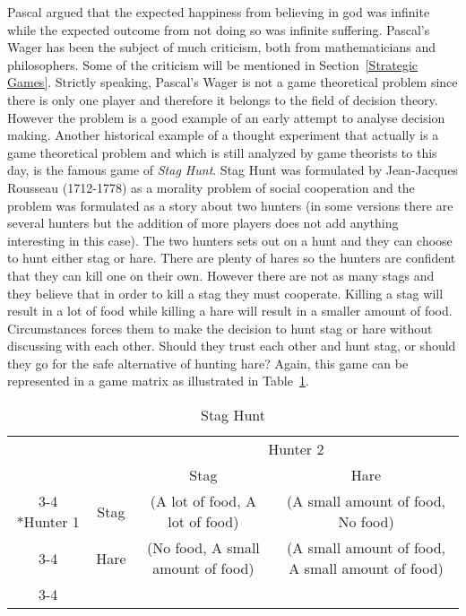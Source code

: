 \documentclass{article}
\theoremstyle{definition}
\theoremstyle{remark}
\begin{document}
Pascal argued that the expected happiness from believing in god was
infinite while the expected outcome from not doing so was infinite
suffering. Pascal's Wager has been the subject of much criticism, both
from mathematicians and philosophers. Some of the criticism
  will be mentioned in Section~\ref{Strategic Games}. Strictly speaking, Pascal's Wager is not a
game theoretical problem since there is only one player and therefore it
belongs to the field of decision theory. However the problem is a good
example of an early attempt to analyse decision making. Another
historical example of a thought experiment that actually is a game
theoretical problem and which is still analyzed by game theorists to
this day, is the famous game of \emph{Stag Hunt}. Stag Hunt was
formulated by Jean-Jacques Rousseau (1712-1778) as a morality problem
of social cooperation and the problem was formulated as a story about two
hunters (in some versions there are several hunters but the addition
of more players does not add anything interesting in this case). \citep{sep-game-ethics} The
two hunters sets out on a hunt and they can choose to hunt either stag
or hare. There are plenty of hares so the hunters are confident that
they can kill one on their own. However there are not as many stags
and they believe that in order to kill a stag they must
cooperate. Killing a stag will result in a lot of food while killing
a hare will result in a smaller amount of food. Circumstances forces
them to make the decision to hunt stag or hare without discussing with
each other. Should they trust each other and hunt stag, or should they
go for the safe alternative of hunting hare? Again, this game can be
represented in a game matrix as illustrated in Table~\ref{Stag hunt 1}.\\ 

\begin{table}[h!]
  \centering
  \setlength{\extrarowheight}{2pt}
  \begin{tabular}{cc|c|c|}
    & \multicolumn{1}{c}{} & \multicolumn{2}{c}{Hunter 2}\\
    & \multicolumn{1}{c}{} & \multicolumn{1}{c}{Stag}  &
                                                              \multicolumn{1}{c}{Hare}
    \\\cline{3-4}
\multirow{2}*{Hunter 1}  & Stag & (A lot of food, A lot of food) &
                                                                   (A small amount
                                        of food,
                                                                   No food) \\\cline{3-4}
    & Hare & (No food, A small amount
                                        of food) & (A small amount
                                        of food, A small amount
                                        of food) \\\cline{3-4}
  \end{tabular}
  \caption{Stag Hunt}
  \label{Stag hunt 1}
\end{table}
\end{document}
